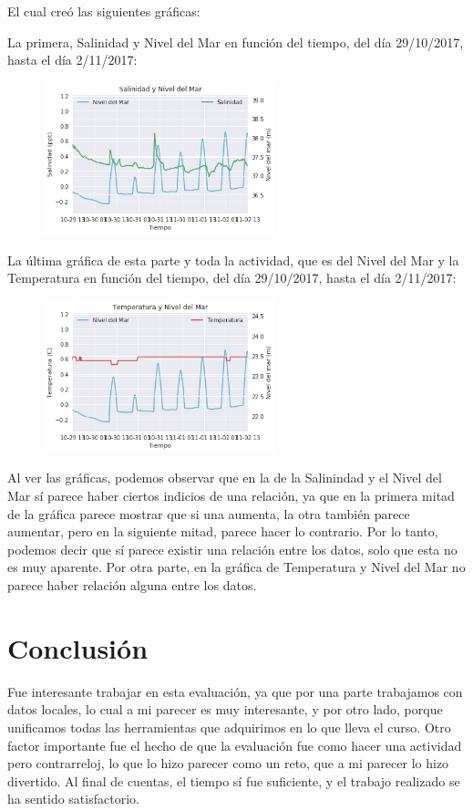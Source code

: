 \documentclass[a4paper]{article}
\begin{document}
El cual creó las siguientes gráficas:

La primera, Salinidad y Nivel del Mar en función del tiempo, del día 29/10/2017, hasta el día 2/11/2017:
\begin{figure}[ht!]
 \centering
  \includegraphics[width=0.6\textwidth]{Matplotlib6.png}
\end{figure}

\pagebreak
La última gráfica de esta parte y toda la actividad, que es del Nivel del Mar y la Temperatura en función del tiempo, del día 29/10/2017, hasta el día 2/11/2017:
\begin{figure}[ht!]
 \centering
  \includegraphics[width=0.6\textwidth]{Matplotlib7.png}
\end{figure}

Al ver las gráficas, podemos observar que en la de la Salinindad y el Nivel del Mar sí parece haber ciertos indicios de una relación, ya que en la primera mitad de la gráfica parece mostrar que si una aumenta, la otra también parece aumentar, pero en la siguiente mitad, parece hacer lo contrario. Por lo tanto, podemos decir que sí parece existir una relación entre los datos, solo que esta no es muy aparente.
Por otra parte, en la gráfica de Temperatura y Nivel del Mar no parece haber relación alguna entre los datos. 

\bigskip
\section{Conclusión}
Fue interesante trabajar en esta evaluación, ya que por una parte trabajamos con datos locales, lo cual a mi parecer es muy interesante, y por otro lado, porque unificamos todas las herramientas que adquirimos en lo que lleva el curso. Otro factor importante fue el hecho de que la evaluación fue como hacer una actividad pero contrarreloj, lo que lo hizo parecer como un reto, que a mi parecer lo hizo divertido. Al final de cuentas, el tiempo sí fue suficiente, y el trabajo realizado se ha sentido satisfactorio. 
\end{document}
